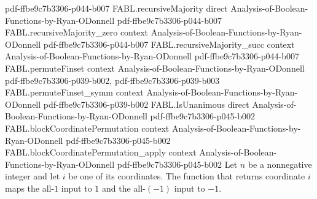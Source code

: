 \begin{theorem}
  {pdf-ffbe9c7b3306-p044-b007}
\proofstep
  {FABL.recursiveMajority}
  {direct}
  {Analysis-of-Boolean-Functions-by-Ryan-ODonnell}
  {pdf-ffbe9c7b3306-p044-b007}
\proofstep
  {FABL.recursiveMajority_zero}
  {context}
  {Analysis-of-Boolean-Functions-by-Ryan-ODonnell}
  {pdf-ffbe9c7b3306-p044-b007}
\proofstep
  {FABL.recursiveMajority_succ}
  {context}
  {Analysis-of-Boolean-Functions-by-Ryan-ODonnell}
  {pdf-ffbe9c7b3306-p044-b007}
\proofstep
  {FABL.permuteFinset}
  {context}
  {Analysis-of-Boolean-Functions-by-Ryan-ODonnell}
  {pdf-ffbe9c7b3306-p039-b002,
    pdf-ffbe9c7b3306-p039-b003}
\proofstep
  {FABL.permuteFinset_symm}
  {context}
  {Analysis-of-Boolean-Functions-by-Ryan-ODonnell}
  {pdf-ffbe9c7b3306-p039-b002}
\proofstep
  {FABL.IsUnanimous}
  {direct}
  {Analysis-of-Boolean-Functions-by-Ryan-ODonnell}
  {pdf-ffbe9c7b3306-p045-b002}
\proofstep
  {FABL.blockCoordinatePermutation}
  {context}
  {Analysis-of-Boolean-Functions-by-Ryan-ODonnell}
  {pdf-ffbe9c7b3306-p045-b002}
\proofstep
  {FABL.blockCoordinatePermutation_apply}
  {context}
  {Analysis-of-Boolean-Functions-by-Ryan-ODonnell}
  {pdf-ffbe9c7b3306-p045-b002}
Let $n$ be a nonnegative integer and let $i$ be one of its coordinates. The function
that returns coordinate $i$ maps the all-$1$ input to $1$ and the all-$(-1)$ input to
$-1$.
\end{theorem}

